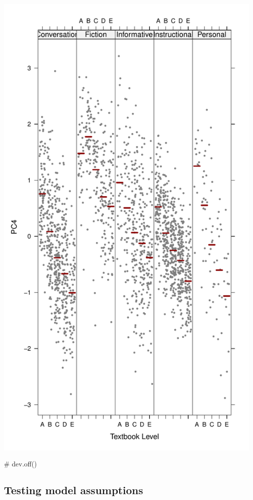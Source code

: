 \documentclass[
  letterpaper,
  DIV=11,
  numbers=noendperiod]{scrreprt}
\newenvironment{Shaded}{\begin{snugshade}}{\end{snugshade}}
\newcommand{\CommentTok}[1]{\textcolor[rgb]{0.37,0.37,0.37}{#1}}
\begin{document}
\includegraphics{AppendixF_files/figure-pdf/unnamed-chunk-34-1.pdf}

\begin{Shaded}
\begin{Highlighting}[]
\CommentTok{\# dev.off()}
\end{Highlighting}
\end{Shaded}

\subsection{Testing model assumptions}\label{testing-model-assumptions}
\end{document}
